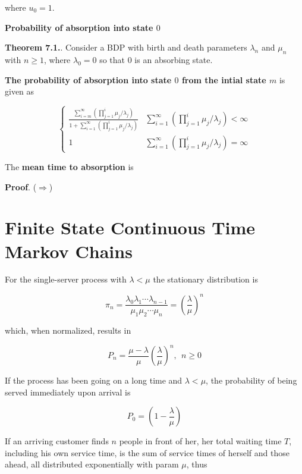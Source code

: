 \documentclass[12pt]{article}
\theoremstyle{nonumberbreak}
\begin{document}
where $u_0 = 1$. 


\textbf{Probability of absorption into state $0$}



\begin{theorem}
\textbf{Theorem 7.1.}. Consider a BDP with birth and death parameters $\lambda_n$ and $\mu_n$ with $n \ge 1$, where $\lambda_0 = 0$ so that $0$ is an absorbing state. 

\textbf{The probability of absorption into state $0$ from the intial state $m$} is given as 

$$
\begin{cases}
\frac{ \sum_{i=m}^\infty \left( \prod_{j=1}^i \mu_j/\lambda_j \right)  }{ 1+ \sum_{i=1}^\infty \left( \prod_{j=1}^i \mu_j/\lambda_j \right)} & \sum_{i=1}^\infty \left( \prod_{j=1}^i \mu_j/\lambda_j \right) < \infty \\
1 & \sum_{i=1}^\infty \left( \prod_{j=1}^i \mu_j/\lambda_j \right) = \infty
\end{cases}
$$

The \textbf{mean time to absorption} is



\end{theorem}

\textbf{Proof}. ($\Rightarrow$) 



\section{Finite State Continuous Time Markov Chains}






For the single-server process with $\lambda < \mu$ the stationary distribution is 

$$
\pi_n = \frac{\lambda_0 \lambda_1 \cdots \lambda_{n-1} }{\mu_1 \mu_2 \cdots \mu_n} = (\frac{\lambda}{\mu})^n
$$

which, when normalized, results in

$$
P_n = \frac{\mu - \lambda}{\mu} (\frac{\lambda}{\mu})^n, \ \ n \ge 0
$$


If the process has been going on a long time and $\lambda < \mu$, the probability of being served immediately upon arrival is 

$$
P_0 = (1 - \frac{\lambda}{\mu})
$$


If an arriving customer finds $n$ people in front of her, her total waiting time $T$, including his own service time, is the sum of service times of herself and those ahead, all distributed exponentially with param $\mu$, thus 
\end{document}
